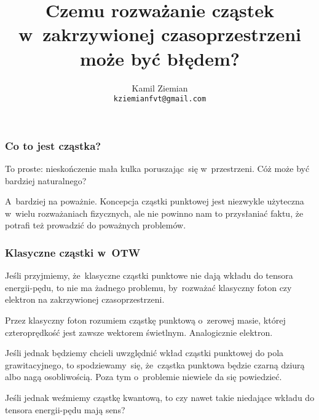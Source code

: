 \documentclass[10pt,t]{beamer}
\title{Czemu rozważanie cząstek w~zakrzywionej czasoprzestrzeni może być
  błędem?}
\author{Kamil Ziemian \\
  \texttt{kziemianfvt@gmail.com}}
\date{}
\begin{document}






\RaggedRight





\maketitle













\begin{frame}
  \frametitle{Co to jest cząstka?}


  To proste: nieskończenie mała kulka poruszając~się w~przestrzeni.
  Cóż może być bardziej naturalnego?

  A~bardziej na poważnie. Koncepcja cząstki punktowej jest niezwykle
  użyteczna w~wielu rozważaniach fizycznych, ale nie powinno nam to
  przysłaniać faktu, że potrafi też prowadzić do poważnych problemów.

\end{frame}





\begin{frame}
  \frametitle{Klasyczne cząstki w~OTW}


  Jeśli przyjmiemy, że~klasyczne cząstki punktowe nie dają wkładu do
  tensora energii-pędu, to nie ma żadnego problemu, by~rozważać
  klasyczny foton czy elektron na zakrzywionej czasoprzestrzeni.

  Przez klasyczny foton rozumiem cząstkę punktową o~zerowej masie,
  której czteroprędkość jest zawsze wektorem świetlnym. Analogicznie
  elektron.

  Jeśli jednak będziemy chcieli uwzględnić wkład cząstki punktowej do
  pola grawitacyjnego, to spodziewamy~się, że~cząstka punktowa będzie
  czarną dziurą albo nagą osobliwością. Poza tym o~problemie niewiele
  da się powiedzieć.

  Jeśli jednak weźmiemy cząstkę kwantową, to czy nawet takie niedające
  wkładu do tensora energii-pędu mają sens?

\end{frame}
\end{document}
